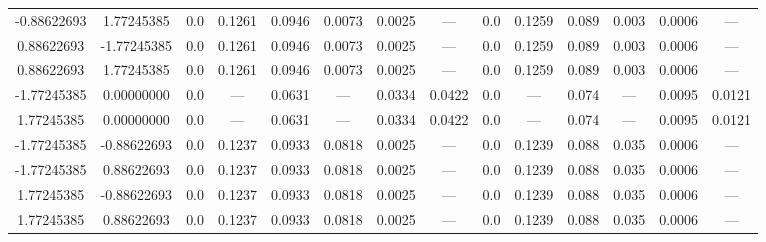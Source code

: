 \documentclass[a4paper,14pt]{extarticle}
\begin{document}
\begin{landscape}
\begin{table}[H]
\begin{tabular}{|c|c|*{6}{c}|*{6}{c}|}
-0.88622693        &  1.77245385        & 0.0    & 0.1261 & 0.0946 & 0.0073 & 0.0025 & ---    & 0.0    & 0.1259 & 0.089  & 0.003  & 0.0006 & ---    \\
 0.88622693        & -1.77245385        & 0.0    & 0.1261 & 0.0946 & 0.0073 & 0.0025 & ---    & 0.0    & 0.1259 & 0.089  & 0.003  & 0.0006 & ---    \\
 0.88622693        &  1.77245385        & 0.0    & 0.1261 & 0.0946 & 0.0073 & 0.0025 & ---    & 0.0    & 0.1259 & 0.089  & 0.003  & 0.0006 & ---    \\
-1.77245385        &  0.00000000        & 0.0    & ---    & 0.0631 & ---    & 0.0334 & 0.0422 & 0.0    & ---    & 0.074  & ---    & 0.0095 & 0.0121 \\
 1.77245385        &  0.00000000        & 0.0    & ---    & 0.0631 & ---    & 0.0334 & 0.0422 & 0.0    & ---    & 0.074  & ---    & 0.0095 & 0.0121 \\
-1.77245385        & -0.88622693        & 0.0    & 0.1237 & 0.0933 & 0.0818 & 0.0025 & ---    & 0.0    & 0.1239 & 0.088  & 0.035  & 0.0006 & ---    \\
-1.77245385        &  0.88622693        & 0.0    & 0.1237 & 0.0933 & 0.0818 & 0.0025 & ---    & 0.0    & 0.1239 & 0.088  & 0.035  & 0.0006 & ---    \\
 1.77245385        & -0.88622693        & 0.0    & 0.1237 & 0.0933 & 0.0818 & 0.0025 & ---    & 0.0    & 0.1239 & 0.088  & 0.035  & 0.0006 & ---    \\
 1.77245385        &  0.88622693        & 0.0    & 0.1237 & 0.0933 & 0.0818 & 0.0025 & ---    & 0.0    & 0.1239 & 0.088  & 0.035  & 0.0006 & ---    \\
\hline
\end{tabular}
\end{table} 


\end{landscape}
\end{document}
